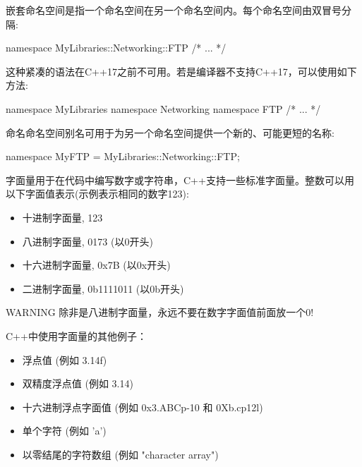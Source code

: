 
嵌套命名空间是指一个命名空间在另一个命名空间内。每个命名空间由双冒号分隔:

\begin{cpp}
namespace MyLibraries::Networking::FTP {
    /* ... */
}
\end{cpp}

这种紧凑的语法在C++17之前不可用。若是编译器不支持C++17，可以使用如下方法:

\begin{cpp}
namespace MyLibraries {
    namespace Networking {
        namespace FTP {
            /* ... */
        }
    }
}
\end{cpp}


命名命名空间别名可用于为另一个命名空间提供一个新的、可能更短的名称:

\begin{cpp}
namespace MyFTP = MyLibraries::Networking::FTP;
\end{cpp}


字面量用于在代码中编写数字或字符串，C++支持一些标准字面量。整数可以用以下字面值表示(示例表示相同的数字123):

\begin{itemize}
\item
十进制字面量, 123

\item
八进制字面量, 0173 (以0开头)

\item
十六进制字面量, 0x7B (以0x开头)

\item
二进制字面量, 0b1111011 (以0b开头)
\end{itemize}

\begin{myWarning}{WARNING}
除非是八进制字面量，永远不要在数字字面值前面放一个0!
\end{myWarning}

C++中使用字面量的其他例子：

\begin{itemize}
\item
浮点值 (例如 3.14f)

\item
双精度浮点值 (例如 3.14)

\item
十六进制浮点字面值 (例如 0x3.ABCp-10 和 0Xb.cp12l)

\item
单个字符 (例如 'a')

\item
以零结尾的字符数组 (例如 "character array")
\end{itemize}

